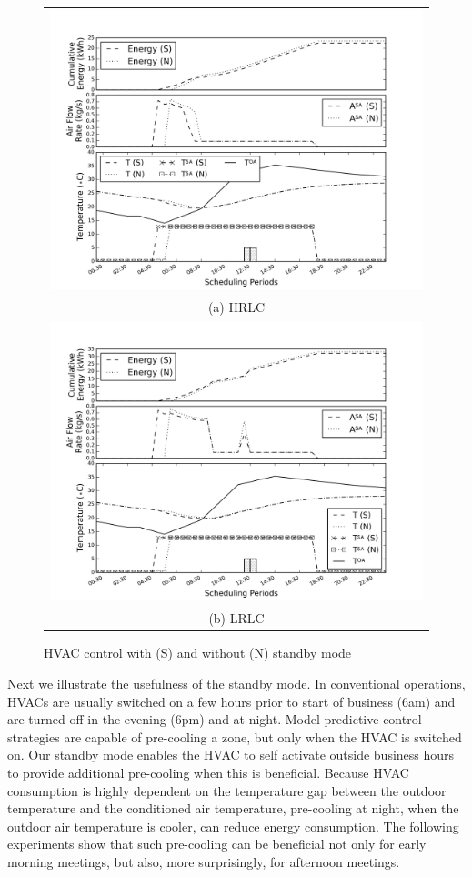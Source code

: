 \begin{figure}
\begin{tabular}{c}
  \includegraphics[width=0.9\linewidth]{figs/hrlc_opt_ws_ns_r0.png} \\
(a) HRLC \\[6pt]
  \includegraphics[width=0.9\linewidth]{figs/lrlc_opt_ws_ns_r0.png} \\
(b) LRLC \\[6pt]
\end{tabular}
\caption{HVAC control with (S) and without (N) standby mode}
\label{fig:standby}
\end{figure}

Next we illustrate the usefulness of the standby mode. In conventional operations, HVACs are usually switched on a few hours prior to start of business (6am) and are turned off in the evening (6pm) and at night. Model predictive control strategies are capable of pre-cooling a zone, but only when the HVAC is switched on. Our standby mode enables the HVAC to self activate outside business hours to provide additional pre-cooling when this is beneficial. Because HVAC consumption is highly dependent on the temperature gap between the outdoor temperature and the conditioned air temperature, pre-cooling at night, when the outdoor air temperature is cooler, can reduce energy consumption. 
The following experiments show that such pre-cooling can be beneficial not only for early morning meetings, but also, more surprisingly, for afternoon meetings. 

